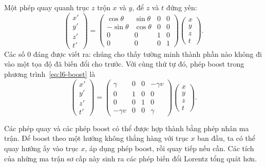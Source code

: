 Một phép quay quanh trục \(z\) trộn \(x\) và \(y\), để \(z\) và \(t\) đứng yên:
\begin{equation}
\begin{pmatrix}
  x'\\ y'\\ z'\\ t'
\end{pmatrix}
=
\begin{pmatrix}
  \cos\theta & \sin\theta & 0 & 0\\
  -\sin\theta & \cos\theta & 0 & 0\\
  0 & 0 & 1 & 0\\
  0 & 0 & 0 & 1
\end{pmatrix}
\begin{pmatrix}
  x\\ y\\ z\\ t
\end{pmatrix}.
\end{equation}
Các số 0 đáng được viết ra: chúng cho thấy tường minh thành phần nào không đi vào một tọa độ đã biến đổi cho trước. Với cùng thứ tự đó, phép boost trong phương trình~\eqref{eq:l6-boost} là
\begin{equation}
\begin{pmatrix}
  x'\\ y'\\ z'\\ t'
\end{pmatrix}
=
\begin{pmatrix}
  \gamma & 0 & 0 & -\gamma v\\
  0 & 1 & 0 & 0\\
  0 & 0 & 1 & 0\\
  -\gamma v & 0 & 0 & \gamma
\end{pmatrix}
\begin{pmatrix}
  x\\ y\\ z\\ t
\end{pmatrix}.
\end{equation}

Các phép quay và các phép boost có thể được hợp thành bằng phép nhân ma trận. Để boost theo một hướng không thẳng hàng với trục \(x\) ban đầu, ta có thể quay hướng ấy vào trục \(x\), áp dụng phép boost, rồi quay tiếp nếu cần. Các tích của những ma trận sơ cấp này sinh ra các phép biến đổi Lorentz tổng quát hơn.

\begin{classroomqa}
\end{classroomqa}

